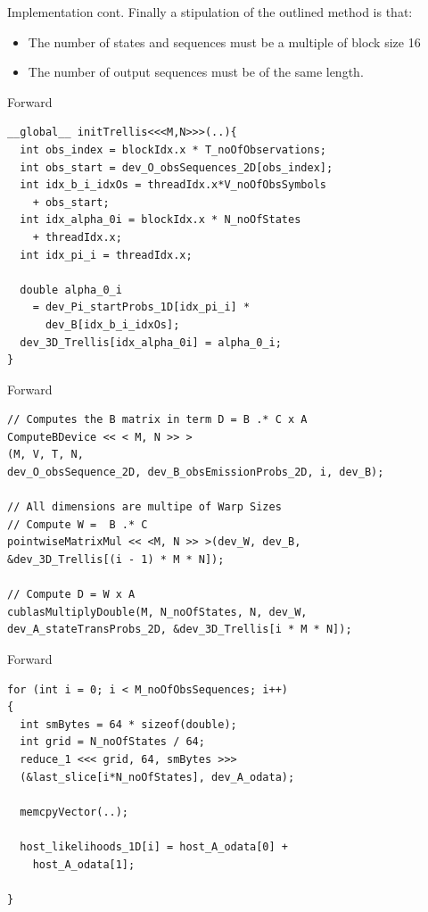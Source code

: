 \documentclass[11pt]{beamer}
\begin{document}
\begin{frame}{Implementation cont.}
Finally a stipulation of the outlined method is that:

\begin{itemize}
\item The number of states and sequences must be a multiple of block size 16
\item The number of output sequences must be of the same length.
\end{itemize}
\end{frame}

\begin{frame}[fragile]{Forward}
\begin{verbatim}
__global__ initTrellis<<<M,N>>>(..){
  int obs_index = blockIdx.x * T_noOfObservations;
  int obs_start = dev_O_obsSequences_2D[obs_index];
  int idx_b_i_idxOs = threadIdx.x*V_noOfObsSymbols 
    + obs_start;
  int idx_alpha_0i = blockIdx.x * N_noOfStates 
    + threadIdx.x;
  int idx_pi_i = threadIdx.x;

  double alpha_0_i 
    = dev_Pi_startProbs_1D[idx_pi_i] * 
      dev_B[idx_b_i_idxOs];
  dev_3D_Trellis[idx_alpha_0i] = alpha_0_i;
}
\end{verbatim}
\end{frame}

\begin{frame}[fragile]{Forward}
\begin{verbatim}
// Computes the B matrix in term D = B .* C x A
ComputeBDevice << < M, N >> >
(M, V, T, N, 
dev_O_obsSequence_2D, dev_B_obsEmissionProbs_2D, i, dev_B);

// All dimensions are multipe of Warp Sizes
// Compute W =  B .* C
pointwiseMatrixMul << <M, N >> >(dev_W, dev_B,
&dev_3D_Trellis[(i - 1) * M * N]);

// Compute D = W x A
cublasMultiplyDouble(M, N_noOfStates, N, dev_W, 
dev_A_stateTransProbs_2D, &dev_3D_Trellis[i * M * N]);
\end{verbatim}
\end{frame}

\begin{frame}[fragile]{Forward}
\begin{verbatim}
for (int i = 0; i < M_noOfObsSequences; i++)
{
  int smBytes = 64 * sizeof(double);
  int grid = N_noOfStates / 64;
  reduce_1 <<< grid, 64, smBytes >>>
  (&last_slice[i*N_noOfStates], dev_A_odata);

  memcpyVector(..);

  host_likelihoods_1D[i] = host_A_odata[0] + 
    host_A_odata[1];

}
\end{verbatim}
\end{frame}
\end{document}
